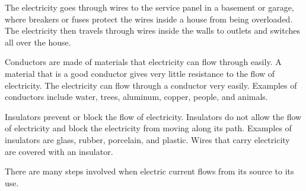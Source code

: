The electricity goes through wires to the service panel in a 
basement or garage, where breakers or fuses protect the
wires inside a house from being overloaded. The electricity then 
travels through wires inside the walls to outlets and
switches all over the house.

Conductors are made of materials that electricity can flow 
through easily. A material that is a good conductor gives
very little resistance to the flow of electricity. The electricity can 
flow through a conductor very easily. Examples
of conductors include water, trees, aluminum, copper, people, 
and animals.

Insulators prevent or block the flow of electricity. Insulators do not 
allow the flow of electricity and block the
electricity from moving along its path. Examples of insulators are 
glass, rubber, porcelain, and plastic. Wires that
carry electricity are covered with an insulator.

There are many steps involved when electric current flows from 
its source to its use.

